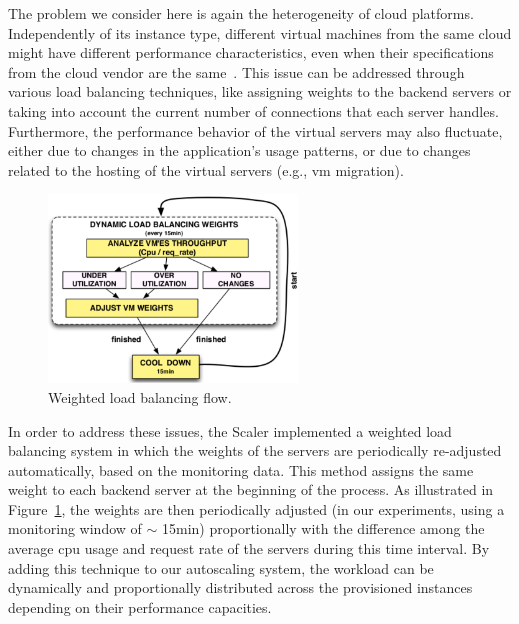 The problem we consider here is again the heterogeneity of cloud platforms.
Independently of its instance type, different virtual machines from the same cloud might have different performance
characteristics, even when their specifications from the cloud vendor are 
the same~\cite{ec2Performance}. This issue can be addressed through various 
load balancing techniques, like assigning weights to the backend servers or 
taking into account the current number of connections that each server 
handles. Furthermore, the performance behavior of the virtual servers may 
also fluctuate, either due to changes in the application's usage 
patterns, or due to changes related to the hosting of the virtual servers 
(e.g., vm migration).


\begin{figure}[htb]
  \begin{center}
    \includegraphics[height=5cm]{images/load_balancing}
  \end{center}
\vspace{-5mm}
  \caption{Weighted load balancing flow.}
  \label{fig:load_balancing}
\end{figure}


In order to address these issues, the Scaler implemented a weighted 
load balancing system in which the weights of the servers are 
periodically re-adjusted automatically, based on the monitoring data.  
This method assigns the same weight to each backend server at the 
beginning of the process. As illustrated in Figure~\ref{fig:load_balancing}, the weights are then periodically
adjusted (in our experiments, using a monitoring window of $\sim$ 15min) proportionally 
with the difference among the average cpu usage and request rate of the servers 
during this time interval. By adding this technique to our autoscaling system, 
the workload can be dynamically and proportionally distributed across the provisioned instances
depending on their performance capacities.




